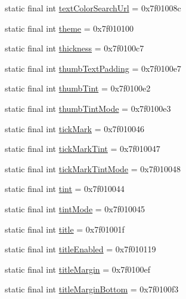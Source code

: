 \begin{CompactItemize}
static final int \hyperlink{classandroid_1_1support_1_1coreutils_1_1_r_1_1attr_4bd932db06e695e8094eeb0249aa73d7}{textColorSearchUrl} = 0x7f01008c
\item 
static final int \hyperlink{classandroid_1_1support_1_1coreutils_1_1_r_1_1attr_9769e0a8579af4be81f6be24f2a340ea}{theme} = 0x7f010100
\item 
static final int \hyperlink{classandroid_1_1support_1_1coreutils_1_1_r_1_1attr_dffc42c13c05f9d6f92c261678e5342b}{thickness} = 0x7f0100c7
\item 
static final int \hyperlink{classandroid_1_1support_1_1coreutils_1_1_r_1_1attr_074a9e5d1c6367df761561ea4feba69c}{thumbTextPadding} = 0x7f0100e7
\item 
static final int \hyperlink{classandroid_1_1support_1_1coreutils_1_1_r_1_1attr_197863eb8627310239e7a262452c7217}{thumbTint} = 0x7f0100e2
\item 
static final int \hyperlink{classandroid_1_1support_1_1coreutils_1_1_r_1_1attr_040206dafbf11db013fcb10c0175eeb4}{thumbTintMode} = 0x7f0100e3
\item 
static final int \hyperlink{classandroid_1_1support_1_1coreutils_1_1_r_1_1attr_c07a9a4ca404fe86115a2829e905acd6}{tickMark} = 0x7f010046
\item 
static final int \hyperlink{classandroid_1_1support_1_1coreutils_1_1_r_1_1attr_bc8fe434aba4013834003b01b7ba0f4f}{tickMarkTint} = 0x7f010047
\item 
static final int \hyperlink{classandroid_1_1support_1_1coreutils_1_1_r_1_1attr_7cc8578a3a74d24df452a38556eec28d}{tickMarkTintMode} = 0x7f010048
\item 
static final int \hyperlink{classandroid_1_1support_1_1coreutils_1_1_r_1_1attr_8456f239685f622db96ca7d7a15fffd4}{tint} = 0x7f010044
\item 
static final int \hyperlink{classandroid_1_1support_1_1coreutils_1_1_r_1_1attr_4eb56355438ed06460f6adf40fbe3094}{tintMode} = 0x7f010045
\item 
static final int \hyperlink{classandroid_1_1support_1_1coreutils_1_1_r_1_1attr_ac04773fb79ff8c6ca587c732a44cf2e}{title} = 0x7f01001f
\item 
static final int \hyperlink{classandroid_1_1support_1_1coreutils_1_1_r_1_1attr_a69ec4cd4fffca76c99485dcd70ed203}{titleEnabled} = 0x7f010119
\item 
static final int \hyperlink{classandroid_1_1support_1_1coreutils_1_1_r_1_1attr_ba146b49064adc1f52905b9bf8cb78ae}{titleMargin} = 0x7f0100ef
\item 
static final int \hyperlink{classandroid_1_1support_1_1coreutils_1_1_r_1_1attr_2047cc01f369ec3eecf6e0f666203c80}{titleMarginBottom} = 0x7f0100f3

\end{CompactItemize}
